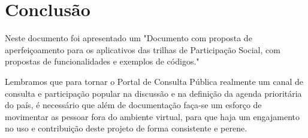 \documentclass[12pt]{article}
\newcommand{\ProductDescription}{"Documento com proposta de aperfeiçoamento
  para os aplicativos das trilhas de Participação Social, com propostas de
  funcionalidades e exemplos de códigos."
}
\begin{document}
\section{Conclusão}

Neste documento foi apresentado um \ProductDescription

Lembramos que para tornar o Portal de Consulta Pública realmente um canal de
consulta e participação popular na discussão e na definição da agenda
prioritária do país, é necessário que além de documentação faça-se um esforço
de movimentar as pessoar fora do ambiente virtual, para que haja um
engajamento no uso e contribuição deste projeto de forma consistente e perene.

\newpage

\newpage
\listoffigures
\newpage
\printindex
\newpage

\appendix
\appendixpage

\end{document}
